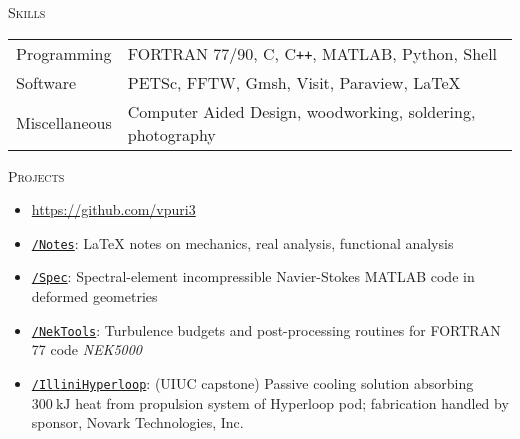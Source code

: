 \documentclass[10pt]{article}
\begin{document}
\vspace{-1.5em}
\begin{multicols}{2}
\textsc{Skills}
\columnbreak

\begin {table}[H]
\begin{tabular}{l l }
\hspace{-0.5em}Programming   & \hspace{-0.0em} FORTRAN 77/90, C, C\texttt{++}, MATLAB, Python, Shell\\
\hspace{-0.5em}Software      & \hspace{-0.0em} PETSc, FFTW, Gmsh, Visit, Paraview, \LaTeX\\
\hspace{-0.5em}Miscellaneous & \hspace{-0.0em} Computer Aided Design, woodworking, soldering, photography \\
\end{tabular}	
\end{table}

\end{multicols}
\vspace{-1.5em}
\begin{multicols}{2}
\textsc{Projects}
\columnbreak

\vspace{-1.75em}
\begin{itemize}[label=-]
    \setlength{\itemindent}{-1.75em}
    \setlength\itemsep{-0.25em}
    \item[]\hspace{-1.0em} \url{https://github.com/vpuri3}
    \item \href{https://github.com/vpuri3/Notes}{\texttt{/Notes}}: \LaTeX{} notes on mechanics, real analysis, functional analysis
    \item \href{https://github.com/vpuri3/Spec}{\texttt{/Spec}}: Spectral-element incompressible Navier-Stokes MATLAB code in deformed geometries
    \item \href{https://github.com/vpuri3/NekTools}{\texttt{/NekTools}}: Turbulence budgets and post-processing routines for FORTRAN 77 code \textit{NEK5000}
    \item \href{https://github.com/vpuri3/IlliniHyperloop}{\texttt{/IlliniHyperloop}}: (UIUC capstone) Passive cooling solution absorbing $\SI{300}{\kilo \joule}$ heat from propulsion system of Hyperloop pod; fabrication handled by sponsor, Novark Technologies, Inc.
\end{itemize}
\vspace{-2.0em}

\end{multicols}
\vspace{-1.5em}
\vfill
\end{document}
